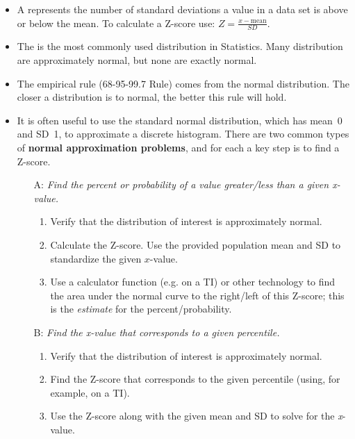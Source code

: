 \begin{itemize}
\item A  represents the number of standard deviations a value in a data set is above or below the mean.  To calculate a \mbox{Z-score} use: $Z = \frac{x-\text{mean}}{SD}$.  

\item The  is the most commonly used distribution in Statistics.  Many distribution are approximately normal, but none are exactly normal.  

\item The empirical rule (68-95-99.7 Rule) comes from the normal distribution.  The closer a distribution is to normal, the better this rule will hold.

\item It is often useful to use the standard normal distribution, which has mean~0 and SD~1, to approximate a discrete histogram.  There are two common types of \textbf{normal approximation problems}, and for each a key step is to find a \mbox{Z-score}.   
\begin{itemize}
\item[A:] \textit{Find the percent or probability of a value greater/less than a given \textit{x}-value.  }
\begin{enumerate}\vspace{-1mm}
\setlength{\itemsep}{0mm}
\item Verify that the distribution of interest is approximately normal.
\item Calculate the \mbox{Z-score}.  Use the provided population mean and SD to standardize the given $x$-value.
\item Use a calculator function (e.g.  on a TI) or other technology to find the area under the normal curve to the right/left of this \mbox{Z-score}; this is the \textit{estimate} for the percent/probability.
\end{enumerate}

\item[B:] \textit{Find the \textit{x}-value that corresponds to a given percentile.}
\begin{enumerate}\vspace{-1mm}
\setlength{\itemsep}{0mm}
\item Verify that the distribution of interest is approximately normal.
\item Find the Z-score that corresponds to the given percentile (using, for example,  on a TI).  
\item Use the Z-score along with the given mean and SD to solve for the \textit{x}-value.  
\end{enumerate}
\end{itemize}




\end{itemize}

